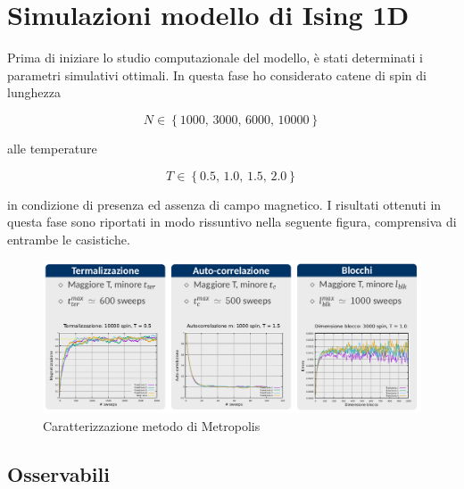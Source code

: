 \section{Simulazioni modello di Ising 1D}

Prima di iniziare lo studio computazionale del modello, è stati determinati i parametri simulativi ottimali. In questa fase ho 
considerato catene di spin di lunghezza 

$$
N \in \left\{1000,\,3000,\,6000,\,10000\right\}
$$

alle temperature

$$
T \in \left\{0.5,\,1.0,\,1.5,\,2.0\right\}
$$

in condizione di presenza ed assenza di campo magnetico. I risultati ottenuti in questa fase sono riportati in modo rissuntivo 
nella seguente figura, comprensiva di entrambe le casistiche. 

\begin{figure}[H]
    \centering
    \includegraphics[width=\textwidth]{Immagini/simIsing1D/carMetro.png}
    \caption{Caratterizzazione metodo di Metropolis}
    \label{fig: car_Ising1D}
\end{figure}



\subsection{Osservabili}


